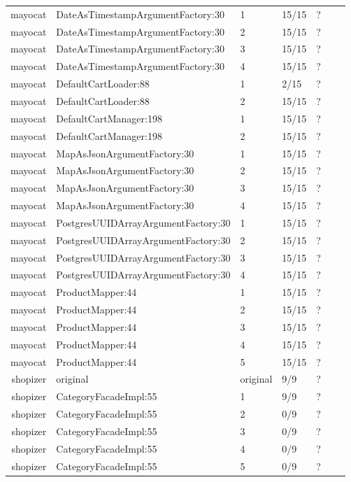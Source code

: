 \begin{table}
\begin{tabular}{|r|l|l|l|l|l|r|}
    mayocat & DateAsTimestampArgumentFactory:30 & 1 & 15/15 & ? \\
    mayocat & DateAsTimestampArgumentFactory:30 & 2 & 15/15 & ? \\
    mayocat & DateAsTimestampArgumentFactory:30 & 3 & 15/15 & ? \\
    mayocat & DateAsTimestampArgumentFactory:30 & 4 & 15/15 & ? \\
    mayocat & DefaultCartLoader:88 & 1 & 2/15 & ? \\
    mayocat & DefaultCartLoader:88 & 2 & 15/15 & ? \\
    mayocat & DefaultCartManager:198 & 1 & 15/15 & ? \\
    mayocat & DefaultCartManager:198 & 2 & 15/15 & ? \\
    mayocat & MapAsJsonArgumentFactory:30 & 1 & 15/15 & ? \\
    mayocat & MapAsJsonArgumentFactory:30 & 2 & 15/15 & ? \\
    mayocat & MapAsJsonArgumentFactory:30 & 3 & 15/15 & ? \\
    mayocat & MapAsJsonArgumentFactory:30 & 4 & 15/15 & ? \\
    mayocat & PostgresUUIDArrayArgumentFactory:30 & 1 & 15/15 & ? \\
    mayocat & PostgresUUIDArrayArgumentFactory:30 & 2 & 15/15 & ? \\
    mayocat & PostgresUUIDArrayArgumentFactory:30 & 3 & 15/15 & ? \\
    mayocat & PostgresUUIDArrayArgumentFactory:30 & 4 & 15/15 & ? \\
    mayocat & ProductMapper:44 & 1 & 15/15 & ? \\
    mayocat & ProductMapper:44 & 2 & 15/15 & ? \\
    mayocat & ProductMapper:44 & 3 & 15/15 & ? \\
    mayocat & ProductMapper:44 & 4 & 15/15 & ? \\
    mayocat & ProductMapper:44 & 5 & 15/15 & ? \\
    shopizer & original & original & 9/9 & ? \\
    shopizer & CategoryFacadeImpl:55 & 1 & 9/9 & ? \\
    shopizer & CategoryFacadeImpl:55 & 2 & 0/9 & ? \\
    shopizer & CategoryFacadeImpl:55 & 3 & 0/9 & ? \\
    shopizer & CategoryFacadeImpl:55 & 4 & 0/9 & ? \\
    shopizer & CategoryFacadeImpl:55 & 5 & 0/9 & ? \\

\end{tabular}
\end{table}

